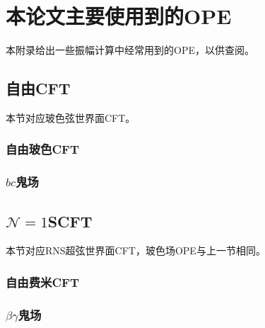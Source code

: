 
\chapter{本论文主要使用到的OPE}
本附录给出一些振幅计算中经常用到的OPE，以供查阅。
\section{自由CFT}
本节对应玻色弦世界面CFT。
\subsection{自由玻色CFT}

\subsection{$bc$鬼场}
\section{$\mathcal{N}=1$SCFT}
本节对应RNS超弦世界面CFT，玻色场OPE与上一节相同。
\subsection{自由费米CFT}

\subsection{$\beta\gamma$鬼场}

